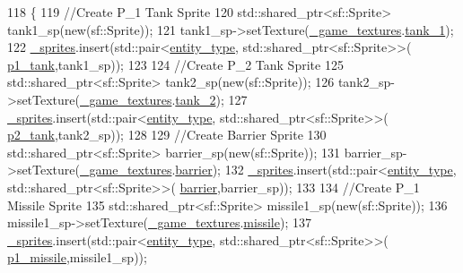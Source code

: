 \begin{DoxyCode}
118 \{
119     \textcolor{comment}{//Create P\_1 Tank Sprite}
120     std::shared\_ptr<sf::Sprite> tank1\_sp(\textcolor{keyword}{new}(sf::Sprite));
121     tank1\_sp->setTexture(\hyperlink{classDisplay_a64ae525710346f1a982efa05b8c53a88}{\_game\_textures}.\hyperlink{structtextures_a9287e247a5d108ed875b7b5b89ded524}{tank\_1});
122     \hyperlink{classDisplay_a975326ca007706c154317ddef67000f4}{\_sprites}.insert(std::pair<\hyperlink{Structures_8h_a6d8f83e710b27d4f86c45f0bb77066e3}{entity\_type}, std::shared\_ptr<sf::Sprite>>(
      \hyperlink{Structures_8h_a6d8f83e710b27d4f86c45f0bb77066e3a31fa78b2b7dd774f5158a16ef230932e}{p1\_tank},tank1\_sp));
123 
124     \textcolor{comment}{//Create P\_2 Tank Sprite}
125     std::shared\_ptr<sf::Sprite> tank2\_sp(\textcolor{keyword}{new}(sf::Sprite));
126     tank2\_sp->setTexture(\hyperlink{classDisplay_a64ae525710346f1a982efa05b8c53a88}{\_game\_textures}.\hyperlink{structtextures_a3322b3f064640afe1a4ebdb53636b71d}{tank\_2});
127     \hyperlink{classDisplay_a975326ca007706c154317ddef67000f4}{\_sprites}.insert(std::pair<\hyperlink{Structures_8h_a6d8f83e710b27d4f86c45f0bb77066e3}{entity\_type}, std::shared\_ptr<sf::Sprite>>(
      \hyperlink{Structures_8h_a6d8f83e710b27d4f86c45f0bb77066e3a3d48d62c7b88e7ee171698fe56dc9e59}{p2\_tank},tank2\_sp));
128 
129     \textcolor{comment}{//Create Barrier Sprite}
130     std::shared\_ptr<sf::Sprite> barrier\_sp(\textcolor{keyword}{new}(sf::Sprite));
131     barrier\_sp->setTexture(\hyperlink{classDisplay_a64ae525710346f1a982efa05b8c53a88}{\_game\_textures}.\hyperlink{structtextures_a36f35bd26858ecc8eb507e1072bfad7d}{barrier});
132     \hyperlink{classDisplay_a975326ca007706c154317ddef67000f4}{\_sprites}.insert(std::pair<\hyperlink{Structures_8h_a6d8f83e710b27d4f86c45f0bb77066e3}{entity\_type}, std::shared\_ptr<sf::Sprite>>(
      \hyperlink{Structures_8h_a6d8f83e710b27d4f86c45f0bb77066e3a6fb040c958f554e1d8320926b700b59d}{barrier},barrier\_sp));
133 
134     \textcolor{comment}{//Create P\_1 Missile Sprite}
135     std::shared\_ptr<sf::Sprite> missile1\_sp(\textcolor{keyword}{new}(sf::Sprite));
136     missile1\_sp->setTexture(\hyperlink{classDisplay_a64ae525710346f1a982efa05b8c53a88}{\_game\_textures}.\hyperlink{structtextures_a1d12557e92da80a9809f037edfe72f2f}{missile});
137     \hyperlink{classDisplay_a975326ca007706c154317ddef67000f4}{\_sprites}.insert(std::pair<\hyperlink{Structures_8h_a6d8f83e710b27d4f86c45f0bb77066e3}{entity\_type}, std::shared\_ptr<sf::Sprite>>(
      \hyperlink{Structures_8h_a6d8f83e710b27d4f86c45f0bb77066e3af89bc631e9b0140ed004b5ce2db5330c}{p1\_missile},missile1\_sp));

\end{DoxyCode}

